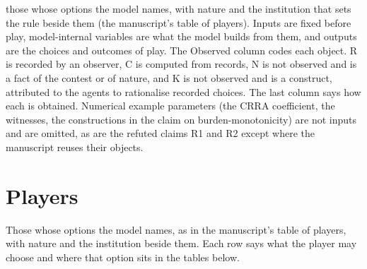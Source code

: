 \documentclass[11pt]{article}
\begin{document}
those whose options the model names, with nature and the institution that sets
the rule beside them (the manuscript's table of players). Inputs are fixed before play,
model-internal variables are what the model builds from them, and outputs are
the choices and outcomes of play. The Observed column codes each
object. R is recorded by an observer, C is computed from records, N is not
observed and is a fact of the contest or of nature, and K is not observed and
is a construct, attributed to the agents to rationalise recorded choices. The
last column says how each is obtained. Numerical example parameters (the
CRRA coefficient, the witnesses, the constructions in the claim on
burden-monotonicity) are not inputs and are omitted, as are the refuted claims
R1 and R2 except where the manuscript reuses their objects.

\section*{Players}

Those whose options the model names, as in the manuscript's table of players, with
nature and the institution beside them. Each row says what the player may
choose and where that option sits in the tables below.
\end{document}
